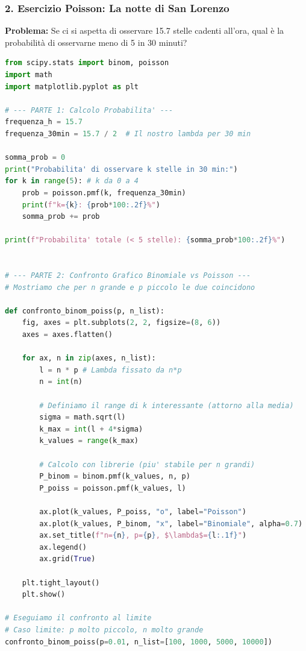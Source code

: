 \documentclass[openany,a4paper,12pt]{book}
\theoremstyle{remark}
\begin{document}
\subsubsection*{2. Esercizio Poisson: La notte di San Lorenzo}
\textbf{Problema:} Se ci si aspetta di osservare 15.7 stelle cadenti all'ora, qual è la probabilità di osservarne meno di 5 in 30 minuti?

\begin{lstlisting}[language=Python, frame=single, caption={Calcolo Poisson e confronto con Binomiale}]
from scipy.stats import binom, poisson
import math
import matplotlib.pyplot as plt

# --- PARTE 1: Calcolo Probabilita' ---
frequenza_h = 15.7
frequenza_30min = 15.7 / 2  # Il nostro lambda per 30 min

somma_prob = 0
print("Probabilita' di osservare k stelle in 30 min:")
for k in range(5): # k da 0 a 4
    prob = poisson.pmf(k, frequenza_30min)
    print(f"k={k}: {prob*100:.2f}%")
    somma_prob += prob

print(f"Probabilita' totale (< 5 stelle): {somma_prob*100:.2f}%")


# --- PARTE 2: Confronto Grafico Binomiale vs Poisson ---
# Mostriamo che per n grande e p piccolo le due coincidono

def confronto_binom_poiss(p, n_list):
    fig, axes = plt.subplots(2, 2, figsize=(8, 6))
    axes = axes.flatten()

    for ax, n in zip(axes, n_list):
        l = n * p # Lambda fissato da n*p
        n = int(n)
        
        # Definiamo il range di k interessante (attorno alla media)
        sigma = math.sqrt(l)
        k_max = int(l + 4*sigma)
        k_values = range(k_max)

        # Calcolo con librerie (piu' stabile per n grandi)
        P_binom = binom.pmf(k_values, n, p)
        P_poiss = poisson.pmf(k_values, l)

        ax.plot(k_values, P_poiss, "o", label="Poisson")
        ax.plot(k_values, P_binom, "x", label="Binomiale", alpha=0.7)
        ax.set_title(f"n={n}, p={p}, $\lambda$={l:.1f}")
        ax.legend()
        ax.grid(True)
    
    plt.tight_layout()
    plt.show()

# Eseguiamo il confronto al limite
# Caso limite: p molto piccolo, n molto grande
confronto_binom_poiss(p=0.01, n_list=[100, 1000, 5000, 10000])
\end{lstlisting}
\end{document}
